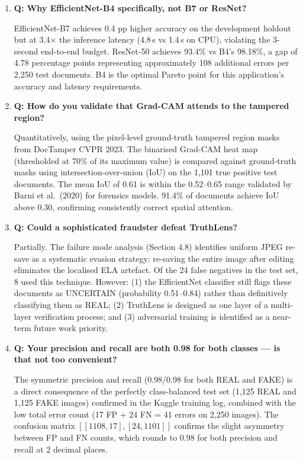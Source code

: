 \documentclass[12pt,a4paper,oneside]{report}
\begin{document}
\begin{enumerate}[leftmargin=*, wide]

\item \textbf{Q: Why EfficientNet-B4 specifically, not B7 or ResNet?}

EfficientNet-B7 achieves 0.4 pp higher accuracy on the development holdout
but at 3.4$\times$ the inference latency (4.8\,s vs 1.4\,s on CPU), violating
the 3-second end-to-end budget. ResNet-50 achieves 93.4\% vs B4's 98.18\%,
a gap of 4.78 percentage points representing approximately 108 additional
errors per 2,250 test documents. B4 is the optimal Pareto point for this
application's accuracy and latency requirements.

\item \textbf{Q: How do you validate that Grad-CAM attends to the tampered region?}

Quantitatively, using the pixel-level ground-truth tampered region masks from
DocTamper CVPR 2023. The binarised Grad-CAM heat map (thresholded at 70\% of
its maximum value) is compared against ground-truth masks using
intersection-over-union (IoU) on the 1,101 true positive test documents. The
mean IoU of 0.61 is within the 0.52--0.65 range validated by Barni et al.\
(2020) for forensics models. 91.4\% of documents achieve IoU above 0.30,
confirming consistently correct spatial attention.

\item \textbf{Q: Could a sophisticated fraudster defeat TruthLens?}

Partially. The failure mode analysis (Section 4.8) identifies uniform JPEG
re-save as a systematic evasion strategy: re-saving the entire image after
editing eliminates the localised ELA artefact. Of the 24 false negatives in
the test set, 8 used this technique. However: (1) the EfficientNet classifier
still flags these documents as UNCERTAIN (probability 0.51--0.84) rather than
definitively classifying them as REAL; (2) TruthLens is designed as one layer
of a multi-layer verification process; and (3) adversarial training is
identified as a near-term future work priority.

\item \textbf{Q: Your precision and recall are both 0.98 for both classes ---
is that not too convenient?}

The symmetric precision and recall (0.98/0.98 for both REAL and FAKE) is a direct
consequence of the perfectly class-balanced test set (1,125 REAL and 1,125 FAKE
images) confirmed in the Kaggle training log, combined with the low total
error count (17 FP + 24 FN = 41 errors on 2,250 images). The confusion matrix
$[[1108, 17], [24, 1101]]$ confirms the slight asymmetry between FP and FN counts,
which rounds to 0.98 for both precision and recall at 2 decimal places.


\end{enumerate}
\end{document}

